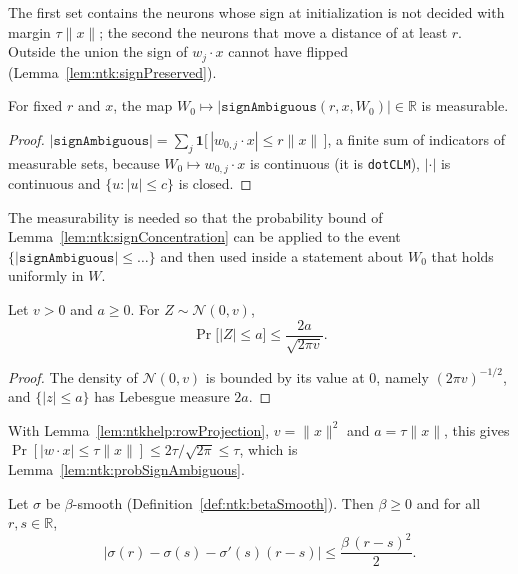 The first set contains the neurons whose sign at initialization is not decided with margin $\tau\|x\|$; the second the neurons that move a distance of at least $r$. Outside the union the sign of $w_j\cdot x$ cannot have flipped (Lemma~\ref{lem:ntk:signPreserved}).

\begin{lemma}\label{lem:ntkhelp:ambiguousMeasurable}
  \leanok
For fixed $r$ and $x$, the map $W_0\mapsto\bigl|\texttt{signAmbiguous}(r,x,W_0)\bigr|\in\mathbb R$ is measurable.
\end{lemma}

\begin{proof}
  \leanok
$|\texttt{signAmbiguous}|=\sum_j\mathbf 1\bigl[\,|w_{0,j}\cdot x|\le r\|x\|\,\bigr]$, a finite sum of indicators of measurable sets, because $W_0\mapsto w_{0,j}\cdot x$ is continuous (it is \texttt{dotCLM}), $|\cdot|$ is continuous and $\{u:|u|\le c\}$ is closed.
\end{proof}

The measurability is needed so that the probability bound of Lemma~\ref{lem:ntk:signConcentration} can be applied to the event $\{|\texttt{signAmbiguous}|\le\ldots\}$ and then used inside a statement about $W_0$ that holds uniformly in $W$.

\begin{lemma}\label{lem:ntkhelp:smallBall}
  \leanok
Let $v>0$ and $a\ge0$. For $Z\sim\mathcal N(0,v)$,
\[
  \Pr\bigl[|Z|\le a\bigr]\le\frac{2a}{\sqrt{2\pi v}} .
\]
\end{lemma}

\begin{proof}
  \leanok
The density of $\mathcal N(0,v)$ is bounded by its value at $0$, namely $(2\pi v)^{-1/2}$, and $\{|z|\le a\}$ has Lebesgue measure $2a$.
\end{proof}

With Lemma~\ref{lem:ntkhelp:rowProjection}, $v=\|x\|^2$ and $a=\tau\|x\|$, this gives $\Pr[|w\cdot x|\le\tau\|x\|]\le2\tau/\sqrt{2\pi}\le\tau$, which is Lemma~\ref{lem:ntk:probSignAmbiguous}.

\begin{lemma}\label{lem:ntkhelp:taylor}
  \leanok
Let $\sigma$ be $\beta$-smooth (Definition~\ref{def:ntk:betaSmooth}). Then $\beta\ge0$ and for all $r,s\in\mathbb R$,
\[
  \bigl|\sigma(r)-\sigma(s)-\sigma'(s)(r-s)\bigr|\le\frac{\beta\,(r-s)^2}{2}.
\]
\end{lemma}

